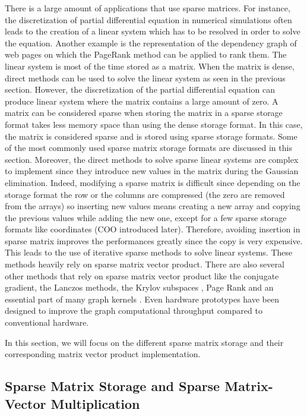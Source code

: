 There is a large amount of applications that use sparse matrices.
For instance, the discretization of partial differential equation in numerical simulations often leads to the creation of a linear system which has to be resolved in order to solve the equation.
Another example is the representation of the dependency graph of web pages on which the PageRank method can be applied to rank them.
The linear system is most of the time stored as a matrix.
When the matrix is dense, direct methods can be used to solve the linear system as seen in the previous section.
However, the discretization of the partial differential equation can produce linear system where the matrix contains a large amount of zero.
A matrix can be considered sparse when storing the matrix in a sparse storage format takes less memory space than using the dense storage format.
In this case, the matrix is considered sparse and is stored using sparse storage formats.
Some of the most commonly used sparse matrix storage formats are discussed in this section.
Moreover, the direct methods to solve sparse linear systems are complex to implement since they introduce new values in the matrix during the Gaussian elimination.
Indeed, modifying a sparse matrix is difficult since depending on the storage format the row or the columns are compressed (the zero are removed from the arrays) so inserting new values means creating a new array and copying the previous values while adding the new one, except for a few sparse storage formats like coordinates (COO introduced later).
Therefore, avoiding insertion in sparse matrix improves the performances greatly since the copy is very expensive.
This leads to the use of iterative sparse methods to solve linear systems.
These methods heavily rely on sparse matrix vector product.
There are also several other methods that rely on sparse matrix vector product like the conjugate gradient, the Lanczos methods, the Krylov subspaces \cite{Saad1989} \cite{Saad2003}, Page Rank \cite{RidiS2002} and an essential part of many graph kernels \cite{KepnG2011}.
Even hardware prototypes \cite{SoGLK2016} have been designed to improve the graph computational throughput compared to conventional hardware.

In this section, we will focus on the different sparse matrix storage and their corresponding matrix vector product implementation.

\subsection{Sparse Matrix Storage and Sparse Matrix-Vector Multiplication}

